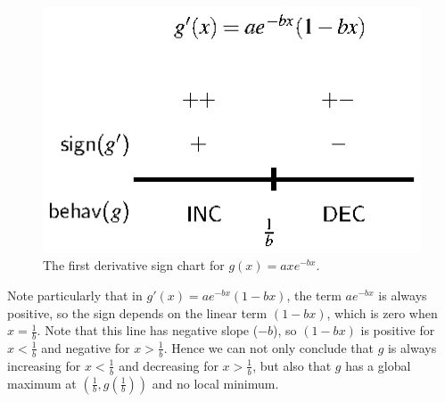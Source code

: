 \begin{figure}[h]
\begin{center}
\includegraphics{figures/3_2_signchartg.eps}
\caption{The first derivative sign chart for $g(x) = axe^{-bx}$.} \label{F:3.2.signchartg}
\end{center}
\end{figure}

Note particularly that in $g'(x) = ae^{-bx}(1-bx)$, the term $ae^{-bx}$ is always positive, so the sign depends on the linear term $(1-bx)$, which is zero when $x = \frac{1}{b}$.  Note that this line has negative slope ($-b$), so $(1-bx)$ is positive for $x < \frac{1}{b}$ and negative for $x > \frac{1}{b}$.  Hence we can not only conclude that $g$ is always increasing for $x < \frac{1}{b}$ and decreasing for $x > \frac{1}{b}$, but also that $g$ has a global maximum at $(\frac{1}{b}, g(\frac{1}{b}))$ and no local minimum.

